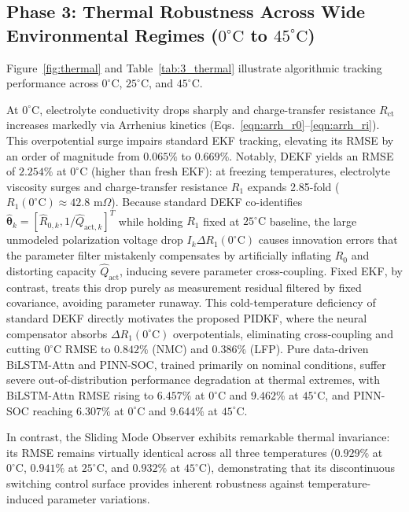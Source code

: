 \documentclass[balance,nocopyright,upint,varvw,hyphenate,barcolor=NavyBlue,nolists]{asmejour}
\begin{document}
\subsection[Phase 3: Thermal Robustness Across Wide Environmental Regimes (0 to 45 deg C)]{Phase 3: Thermal Robustness Across Wide Environmental Regimes ($0^\circ\text{C}$ to $45^\circ\text{C}$)}
Figure~\ref{fig:thermal} and Table~\ref{tab:3_thermal} illustrate algorithmic tracking performance across $0^\circ\text{C}$, $25^\circ\text{C}$, and $45^\circ\text{C}$.

At $0^\circ\text{C}$, electrolyte conductivity drops sharply and charge-transfer resistance $R_{\text{ct}}$ increases markedly via Arrhenius kinetics (Eqs.~\eqref{eqn:arrh_r0}--\eqref{eqn:arrh_ri}). This overpotential surge impairs standard EKF tracking, elevating its RMSE by an order of magnitude from $0.065\%$ to $0.669\%$. Notably, DEKF yields an RMSE of $2.254\%$ at $0^\circ\text{C}$ (higher than fresh EKF): at freezing temperatures, electrolyte viscosity surges and charge-transfer resistance $R_1$ expands 2.85-fold ($R_1(0^\circ\text{C}) \approx 42.8\text{ m}\Omega$). Because standard DEKF co-identifies $\hat{\boldsymbol{\theta}}_k = [\hat{R}_{0,k}, 1/\hat{Q}_{\text{act},k}]^T$ while holding $R_1$ fixed at $25^\circ\text{C}$ baseline, the large unmodeled polarization voltage drop $I_k \Delta R_1(0^\circ\text{C})$ causes innovation errors that the parameter filter mistakenly compensates by artificially inflating $\hat{R}_0$ and distorting capacity $\hat{Q}_{\text{act}}$, inducing severe parameter cross-coupling. Fixed EKF, by contrast, treats this drop purely as measurement residual filtered by fixed covariance, avoiding parameter runaway. This cold-temperature deficiency of standard DEKF directly motivates the proposed PIDKF, where the neural compensator absorbs $\Delta R_1(0^\circ\text{C})$ overpotentials, eliminating cross-coupling and cutting $0^\circ\text{C}$ RMSE to $0.842\%$ (NMC) and $0.386\%$ (LFP). Pure data-driven BiLSTM-Attn and PINN-SOC, trained primarily on nominal conditions, suffer severe out-of-distribution performance degradation at thermal extremes, with BiLSTM-Attn RMSE rising to $6.457\%$ at $0^\circ\text{C}$ and $9.462\%$ at $45^\circ\text{C}$, and PINN-SOC reaching $6.307\%$ at $0^\circ\text{C}$ and $9.644\%$ at $45^\circ\text{C}$.

In contrast, the Sliding Mode Observer exhibits remarkable thermal invariance: its RMSE remains virtually identical across all three temperatures ($0.929\%$ at $0^\circ\text{C}$, $0.941\%$ at $25^\circ\text{C}$, and $0.932\%$ at $45^\circ\text{C}$), demonstrating that its discontinuous switching control surface provides inherent robustness against temperature-induced parameter variations.
\end{document}
